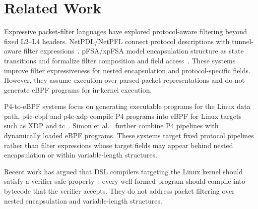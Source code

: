 \section{Related Work}
\label{sec:related}

Expressive packet-filter languages have explored protocol-aware
filtering beyond fixed L2--L4 headers. NetPDL/NetPFL connect
protocol descriptions with tunnel-aware filter
expressions~\cite{risso2006netpdl,ciminiera2010netpfl}.
pFSA/xpFSA model encapsulation structure as state transitions and
formalize filter composition and field
access~\cite{leogrande2015pfsa,cerrato2018xpfsa}. These systems
improve filter expressiveness for nested encapsulation and
protocol-specific fields. However, they assume execution over parsed
packet representations and do not generate eBPF programs for
in-kernel execution.

P4-to-eBPF systems focus on generating executable programs for the
Linux data path. p4c-ebpf and p4c-xdp compile P4 programs into
eBPF for Linux targets such as XDP and
tc~\cite{p4c_ebpf,tu2018p4cxdp}. Simon et
al.~\cite{simon2024honey} further combine P4 pipelines with
dynamically loaded eBPF programs. These systems target fixed protocol
pipelines rather than filter expressions whose target fields may
appear behind nested encapsulation or within variable-length
structures.

Recent work has argued that DSL compilers targeting the Linux
kernel should satisfy a verifier-safe
property~\cite{solleza2025verifiersafe}: every well-formed program
should compile into bytecode that the verifier accepts. They do not
address packet filtering over nested encapsulation and
variable-length structures.